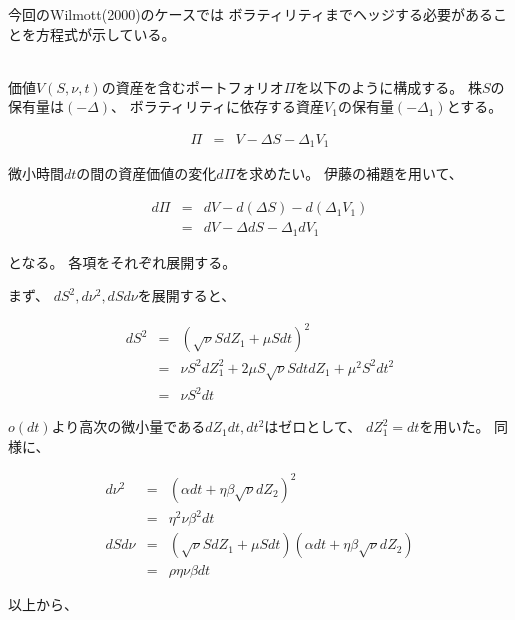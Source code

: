 \documentclass[uplatex,a4j,12pt,dvipdfmx]{jsarticle}
\begin{document}
今回のWilmott(2000)のケースでは
ボラティリティまでヘッジする必要があることを方程式が示している。

\ \\

価値$V(S,\nu,t)$の資産を含むポートフォリオ$\Pi$を以下のように構成する。
株$S$の保有量は$(-\Delta)$、
ボラティリティに依存する資産$V_{1}$の保有量$(-\Delta_{1})$とする。


\begin{eqnarray*}
	\Pi
	&=&
	V - \Delta S - \Delta_{1} V_{1}
\end{eqnarray*}



微小時間$dt$の間の資産価値の変化$d\Pi$を求めたい。
伊藤の補題を用いて、


\begin{eqnarray*}
	d \Pi
	&=&
	dV - d(\Delta S) - d(\Delta_{1} V_{1})
	\\ &=&
	dV - \Delta dS - \Delta_{1} dV_{1}
\end{eqnarray*}


となる。
各項をそれぞれ展開する。

まず、
$dS^{2},d\nu^{2},dSd\nu$を展開すると、


\begin{eqnarray*}
	dS^{2}
	&=&
	(\sqrt{\nu} S dZ_{1} + \mu S dt)^{2}
	\\ &=&
	\nu S^{2} dZ_{1}^{2}
	+
	2 \mu S \sqrt{\nu} S dt dZ_{1}
	+
	\mu^{2} S^{2} dt^{2}
	\\ &=&
	\nu S^{2} dt
\end{eqnarray*}


$o(dt)$より高次の微小量である$dZ_{1}dt,dt^{2}$はゼロとして、
$dZ_{1}^{2} = dt$を用いた。
同様に、


\begin{eqnarray*}
	d \nu^{2}
	&=&
	( \alpha dt + \eta \beta \sqrt{\nu} dZ_{2} )^{2}
	\\ &=&
	\eta^{2} \nu \beta^{2} dt
	\\[3mm]
	dS d \nu
	&=&
	(\sqrt{\nu} S dZ_{1} + \mu S dt)
	( \alpha dt + \eta \beta \sqrt{\nu} dZ_{2} )
	\\ &=&
	\rho \eta \nu \beta dt
\end{eqnarray*}


以上から、
\end{document}
